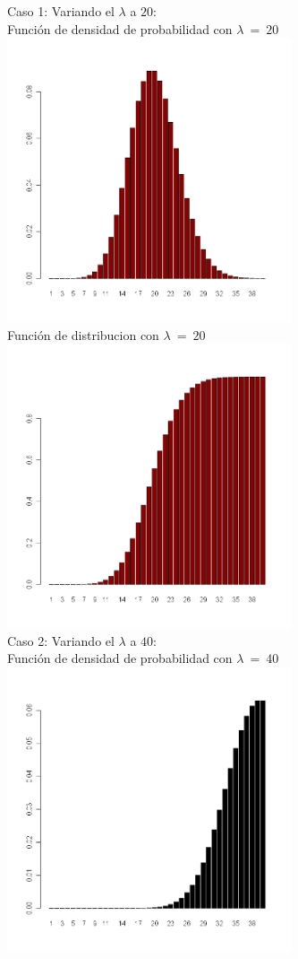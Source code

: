 \begin{itemize}
	Caso 1: Variando el $\lambda$ a $20$:\\
	Funci\'on de densidad de probabilidad con $\lambda\ =\ 20$\\
  	  \includegraphics[width=3.3in,height=3.3in]{images/1_4-dpois20.png}\\
	Funci\'on de distribucion con $\lambda\ =\ 20$\\
  	  \includegraphics[width=3.3in,height=3.3in]{images/1_4-ppois20.png}\\
	Caso 2: Variando el $\lambda$ a $40$:\\
	Funci\'on de densidad de probabilidad con $\lambda\ =\ 40$\\
  	  \includegraphics[width=3.3in,height=3.3in]{images/1_4-dpois40.png}\\

\end{itemize}

